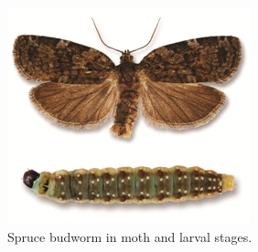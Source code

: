\newpage
\begin{figure}[h!!!tb]
\centering
\includegraphics[width=\ttp]{../Pictures/Spruce_budworm.jpg}
\caption{\label{Spruce_budworm} Spruce budworm in moth and larval stages.}
\end{figure}
